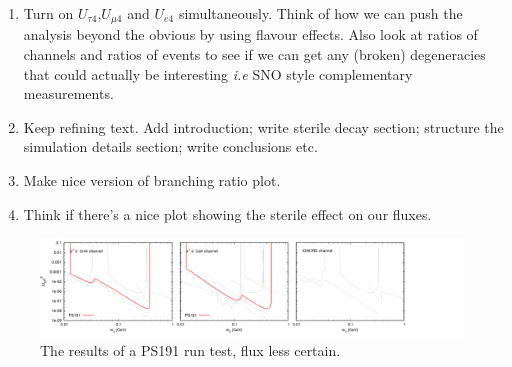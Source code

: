 \documentclass[11pt, a4paper]{article}
\newcommand{\newtext}[2]{\textcolor{#1}{\ul{#2}}}
\begin{document}
\begin{enumerate}
\item Turn on $U_{\tau 4}$,$U_{\mu 4}$ and $U_{e4}$ simultaneously. Think of
how we can push the analysis beyond the obvious by using flavour effects. Also
look at ratios of channels and ratios of events to see if we can get any
(broken) degeneracies that could actually be interesting \emph{i.e} SNO style
complementary measurements.

\item Keep refining text. Add introduction; write sterile decay section; structure 
the simulation details section; write conclusions etc.

\item Make nice version of branching ratio plot. 

\item Think if there's a nice plot showing the sterile effect on our fluxes.


%


	\end{enumerate}



\begin{figure}[t]
\center
\includegraphics[width=1.0\textwidth]{figures/zerobg_um4_ps191_test.pdf}
\caption{The results of a PS191 run test, flux less certain.}
\end{figure}
\end{document}
